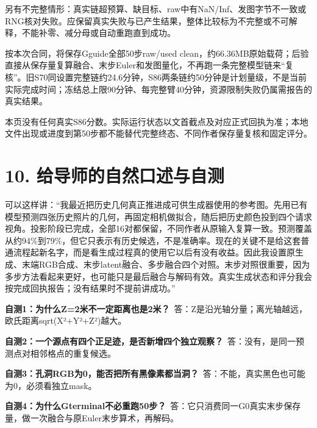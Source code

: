\documentclass[UTF8,11pt,a4paper]{ctexart}
\begin{document}
另有不完整情形：真实链超预算、缺目标、raw中有NaN/Inf、发图字节不一致或RNG核对失败。应保留真实失败与已产生结果，整体比较标为不完整或不可解释，不能补零、减分母或自动重跑直到成功。
\par


按本次合同，将保存Gguide全部50步raw/used clean，约66.36MB原始载荷；后验直接从保存量复算融合、末步Euler和发图量化，不再跑一条完整模型链来“复核”。旧S70同设置完整链约24.6分钟，S86两条链约50分钟是计划量级，不是当前实际完成时间；冻结总上限90分钟、每完整臂40分钟，资源限制失败仍属需报告的真实结果。
\par


本页没有任何真实S86分数。实际运行状态以文首截点及对应正式回执为准；本地文件出现或进度到第50步都不能替代完整终态、不同作者保存量复核和固定评分。
\par


\clearpage

\section*{10. 给导师的自然口述与自测}

可以这样讲：“我最近把历史几何真正推进成可供生成器使用的参考图。先用已有模型预测四张历史照片的几何，再固定相机做拟合，随后把历史颜色投到四个请求视角。投影阶段已完成，全部16对都保留，不同作者从原输入复算一致。预测覆盖从约94\%到79\%，但它只表示有历史候选，不是准确率。现在的关键不是给这套普通流程起新名字，而是看生成过程真的使用它以后有没有收益。因此我设置原生成、末端RGB合成、末步latent融合、多步融合四个对照。末步对照很重要，因为多步方法看起来更好，也可能只是最后融合与解码有效。真实生成状态和评分我会按完成回执报告；没有结果时不提前讲成功。”
\par


\noindent\textbf{自测1：为什么Z=2米不一定距离也是2米？}\ 答：Z是沿光轴分量；离光轴越远，欧氏距离sqrt(X²+Y²+Z²)越大。
\par


\noindent\textbf{自测2：一个源点有四个正足迹，是否新增四个独立观察？}\ 答：没有，是同一预测点对相邻格点的重复候选。
\par


\noindent\textbf{自测3：孔洞RGB为0，能否把所有黑像素都当洞？}\ 答：不能，真实黑色也可能为0，必须看独立mask。
\par


\noindent\textbf{自测4：为什么Gterminal不必重跑50步？}\ 答：它只消费同一G0真实末步保存量，做一次融合与原Euler末步算术，再解码。
\par
\end{document}
